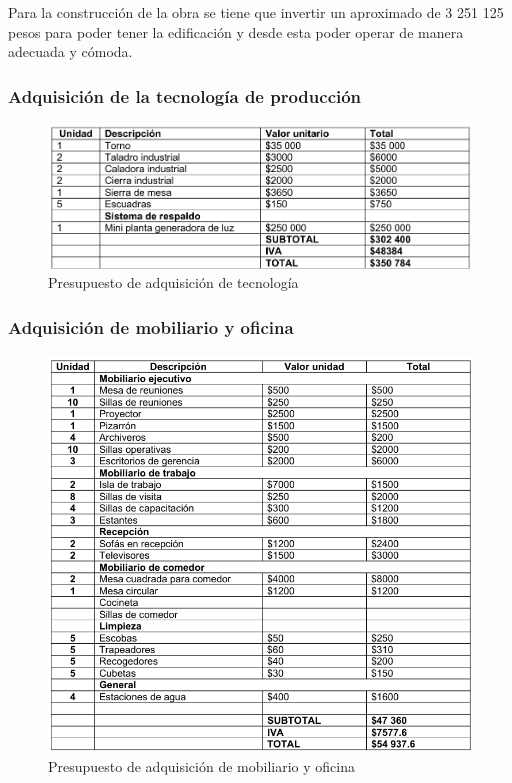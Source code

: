 Para la construcción de la obra se tiene que invertir un aproximado de 3 251 125 pesos para poder tener la edificación y desde esta poder operar de manera adecuada y cómoda. 






\subsubsection{Adquisición de la tecnología de producción}

\begin{figure}[H]
    \centering	
    \includegraphics[width=1.1\textwidth]{chapters/ELC4.png} 
    \caption{Presupuesto de adquisición de tecnología }
\label{fig:croquis190125}
\end{figure}



\subsubsection{Adquisición de mobiliario y oficina}

\begin{figure}[H]
    \centering	
    \includegraphics[width=1.1\textwidth]{chapters/ELC5.png} 
    \caption{Presupuesto de adquisición de mobiliario y oficina }
\label{fig:croquis190125}
\end{figure}

